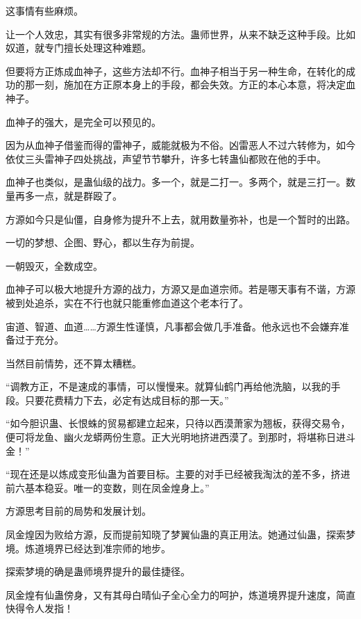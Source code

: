
\begin{this_body}



这事情有些麻烦。

让一个人效忠，其实有很多非常规的方法。蛊师世界，从来不缺乏这种手段。比如奴道，就专门擅长处理这种难题。

但要将方正炼成血神子，这些方法却不行。血神子相当于另一种生命，在转化的成功的那一刻，施加在方正原本身上的手段，都会失效。方正的本心本意，将决定血神子。

血神子的强大，是完全可以预见的。

因为从血神子借鉴而得的雷神子，威能就极为不俗。凶雷恶人不过六转修为，如今依仗三头雷神子四处挑战，声望节节攀升，许多七转蛊仙都败在他的手中。

血神子也类似，是蛊仙级的战力。多一个，就是二打一。多两个，就是三打一。数量再多一点，就是群殴了。

方源如今只是仙僵，自身修为提升不上去，就用数量弥补，也是一个暂时的出路。

一切的梦想、企图、野心，都以生存为前提。

一朝毁灭，全数成空。

血神子可以极大地提升方源的战力，方源又是血道宗师。若是哪天事有不谐，方源被到处追杀，实在不行也就只能重修血道这个老本行了。

宙道、智道、血道……方源生性谨慎，凡事都会做几手准备。他永远也不会嫌弃准备过于充分。

当然目前情势，还不算太糟糕。

“调教方正，不是速成的事情，可以慢慢来。就算仙鹤门再给他洗脑，以我的手段。只要花费精力下去，必定有达成目标的那一天。”

“如今胆识蛊、长恨蛛的贸易都建立起来，只待以西漠萧家为翘板，获得交易令，便可将龙鱼、幽火龙蟒两份生意。正大光明地挤进西漠了。到那时，将堪称日进斗金！”

“现在还是以炼成变形仙蛊为首要目标。主要的对手已经被我淘汰的差不多，挤进前六基本稳妥。唯一的变数，则在凤金煌身上。”

方源思考目前的局势和发展计划。

凤金煌因为败给方源，反而提前知晓了梦翼仙蛊的真正用法。她通过仙蛊，探索梦境。炼道境界已经达到准宗师的地步。

探索梦境的确是蛊师境界提升的最佳捷径。

凤金煌有仙蛊傍身，又有其母白晴仙子全心全力的呵护，炼道境界提升速度，简直快得令人发指！


\end{this_body}
